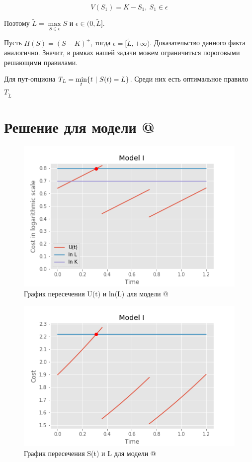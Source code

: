 \documentclass[a4paper,12pt]{article}
\makeatletter
\theoremstyle{definition}
\newcommand*{\rom}[1]{\expandafter\@slowromancap\romannumeral #1@}
\makeatother
\begin{document}
\begin{equation*}
    V(S_1) = K - S_1,\ S_1 \in \epsilon
\end{equation*}

Поэтому $\tilde{L} = \max\limits_{S \in \epsilon} S$ и $\epsilon \in (0, \tilde{L}]$.

Пусть $\Pi (S) = (S - K)^{+}$, тогда $\epsilon = [\tilde{L}, +\infty)$. Доказательство данного факта аналогично. Значит, в рамках нашей задачи можем ограничиться пороговыми решающими правилами.

Для пут-опциона $T_L = \min\limits_{t}\{t\textup{ | }S(t) = L\}$. Среди них есть оптимальное правило $T_{\tilde{L}}$

\section{Решение для модели \rom{1}}


\begin{figure}[htbp]
\label{fig:model1tracklcrosslog}
\centerline{\includegraphics[scale=0.7]{img/model1_with_L_log.png}}
\caption{График пересечения U(t) и ln(L) для модели \rom{1}}
\end{figure}


\begin{figure}[htbp]
\label{fig:model1tracklcross}
\centerline{\includegraphics[scale=0.7]{img/model1_with_L.png}}
\caption{График пересечения S(t) и L для модели \rom{1}}
\end{figure}
\end{document}
